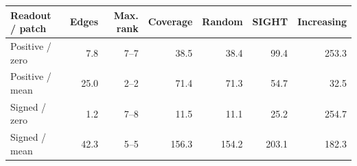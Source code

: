 \begin{tabular}{lrrrrrr}
\toprule
Readout / patch & Edges & Max. rank & Coverage & Random & SIGHT & Increasing \\
\midrule
Positive / zero & 7.8 & 7--7 & 38.5 & 38.4 & 99.4 & 253.3 \\
Positive / mean & 25.0 & 2--2 & 71.4 & 71.3 & 54.7 & 32.5 \\
Signed / zero & 1.2 & 7--8 & 11.5 & 11.1 & 25.2 & 254.7 \\
Signed / mean & 42.3 & 5--5 & 156.3 & 154.2 & 203.1 & 182.3 \\
\bottomrule
\end{tabular}
